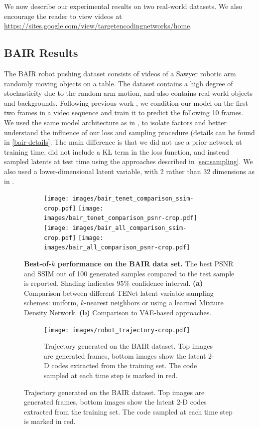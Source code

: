 \documentclass{article}
\newcommand{\modelname}{TENet }
\begin{document}
We now describe our experimental results on two real-world datasets.
We also encourage the reader to view videos at \url{https://sites.google.com/view/targetencodingnetworks/home}.


\subsection{BAIR Results}

The BAIR robot pushing dataset \citep{Ebert17} consists of videos of a Sawyer robotic arm randomly moving objects on a table.
The dataset contains a high degree of stochasticity due to the random arm motion, and also contains real-world objects and backgrounds.
Following previous work \citep{Babaeizadeh2018, Denton2018}, we condition our model on the first two frames in a video sequence and train it to predict the following 10 frames.
We used the same model architecture as in \citep{Denton2018}, to isolate factors and better understand the influence of our loss and sampling procedure (details can be found in \cref{bair-details}.
The main difference is that we did not use a prior network at training time, did not include a KL term in the loss function, and instead sampled latents at test time using the approaches described in \cref{sec:sampling}.
We also used a lower-dimensional latent variable, with 2 rather than 32 dimensions as in \citep{Denton2018}.

\begin{figure}
  \centering
  \begin{subfigure}[b]{\textwidth}
    \centering
  \texttt{[image: images/bair\_tenet\_comparison\_ssim-crop.pdf]}
  \texttt{[image: images/bair\_tenet\_comparison\_psnr-crop.pdf]}
  \texttt{[image: images/bair\_all\_comparison\_ssim-crop.pdf]}
  \texttt{[image: images/bair\_all\_comparison\_psnr-crop.pdf]}
  \caption{}
  \end{subfigure}
  \caption{
    \textbf{Best-of-$k$ performance on the BAIR data set.}
    The best PSNR and SSIM out of 100 generated samples compared to the test sample is reported.
    Shading indicates $95\%$ confidence interval.
    \textbf{(a)} Comparison between different \modelname latent variable sampling schemes: uniform, $k$-nearest neighbors or using a learned Mixture Density Network.
    \textbf{(b)} Comparison to VAE-based approaches.
  }
  \label{bair}
\end{figure}





\begin{figure}
  \centering
  \begin{subfigure}[b]{\textwidth}
    \centering
  \texttt{[image: images/robot\_trajectory-crop.pdf]}
  \caption{
    Trajectory generated on the BAIR dataset.
Top images are generated frames, bottom images show the latent 2-D codes extracted from the training set.
The code sampled at each time step is marked in red.
  }
    \label{robot-trajectory}
  \end{subfigure}
\end{figure}
\end{document}
